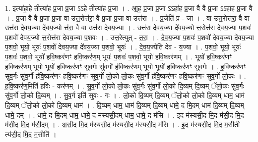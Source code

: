 \documentclass[17pt]{extarticle}
\begin{document}
1. इत्या॑हा॒हे तीत्या॑ह प्र॒जा प्र॒जा ऽऽहे तीत्या॑ह प्र॒जा । . आ॒ह॒ प्र॒जा प्र॒जा ऽऽहा॑ह प्र॒जा वै वै प्र॒जा ऽऽहा॑ह प्र॒जा वै । . प्र॒जा वै वै प्र॒जा प्र॒जा वा उत्त॒रोत्त॑रा॒ वै प्र॒जा प्र॒जा वा उत्त॑रा । . प्र॒जेति॑ प्र - जा । . वा उत्त॒रोत्त॑रा॒ वै वा उत्त॑रा देवय॒ज्या दे॑वय॒ज्यो त्त॑रा॒ वै वा उत्त॑रा देवय॒ज्या । . उत्त॑रा देवय॒ज्या दे॑वय॒ज्यो त्त॒रोत्त॑रा देवय॒ज्या प॒शवः॑ प॒शवो॑ देवय॒ज्यो त्त॒रोत्त॑रा देवय॒ज्या प॒शवः॑ । . उत्त॒रेत्युत् - त॒रा॒ । . दे॒व॒य॒ज्या प॒शवः॑ प॒शवो॑ देवय॒ज्या दे॑वय॒ज्या प॒शवो॒ भूयो॒ भूयः॑ प॒शवो॑ देवय॒ज्या दे॑वय॒ज्या प॒शवो॒ भूयः॑ । . दे॒व॒य॒ज्येति॑ देव - य॒ज्या । . प॒शवो॒ भूयो॒ भूयः॑ प॒शवः॑ प॒शवो॒ भूयो॑ हवि॒ष्कर॑णꣳ हवि॒ष्कर॑ण॒म् भूयः॑ प॒शवः॑ प॒शवो॒ भूयो॑ हवि॒ष्कर॑णम् । . भूयो॑ हवि॒ष्कर॑णꣳ हवि॒ष्कर॑ण॒म् भूयो॒ भूयो॑ हवि॒ष्कर॑णꣳ सुव॒र्गः सु॑व॒र्गो ह॑वि॒ष्कर॑ण॒म् भूयो॒ भूयो॑ हवि॒ष्कर॑णꣳ सुव॒र्गः । . ह॒वि॒ष्कर॑णꣳ सुव॒र्गः सु॑व॒र्गो ह॑वि॒ष्कर॑णꣳ हवि॒ष्कर॑णꣳ सुव॒र्गो लो॒को लो॒कः सु॑व॒र्गो ह॑वि॒ष्कर॑णꣳ हवि॒ष्कर॑णꣳ सुव॒र्गो लो॒कः । . ह॒वि॒ष्कर॑ण॒मिति॑ हविः - कर॑णम् । . सु॒व॒र्गो लो॒को लो॒कः सु॑व॒र्गः सु॑व॒र्गो लो॒को दि॒व्यम् दि॒व्यम् ॅलो॒कः सु॑व॒र्गः सु॑व॒र्गो लो॒को दि॒व्यम् । . सु॒व॒र्ग इति॑ सुवः - गः । . लो॒को दि॒व्यम् दि॒व्यम् ॅलो॒को लो॒को दि॒व्यम् धाम॒ धाम॑ दि॒व्यम् ॅलो॒को लो॒को दि॒व्यम् धाम॑ । . दि॒व्यम् धाम॒ धाम॑ दि॒व्यम् दि॒व्यम् धामे॒ द मि॒दम् धाम॑ दि॒व्यम् दि॒व्यम् धामे॒ दम् । . धामे॒ द मि॒दम् धाम॒ धामे॒ द म॑स्यसी॒दम् धाम॒ धामे॒ द म॑सि । . इ॒द म॑स्यसी॒द मि॒द म॑सी॒द मि॒द म॑सी॒द मि॒द म॑सी॒दम् । . अ॒सी॒द मि॒द म॑स्यसी॒द म॑स्यसी॒द म॑स्यसी॒द म॑सि । . इ॒द म॑स्यसी॒द मि॒द म॒सीती त्य॑सी॒द मि॒द म॒सीति॑ । \newline
\end{document}
